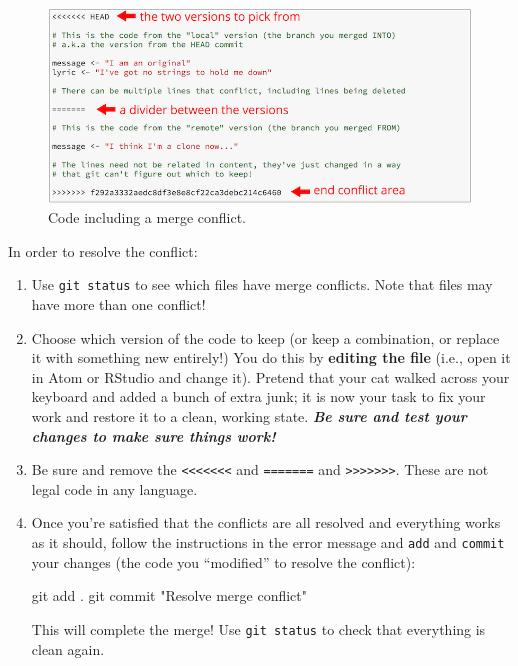 \documentclass[]{book}
\newenvironment{Shaded}{\begin{snugshade}}{\end{snugshade}}
\newcommand{\StringTok}[1]{\textcolor[rgb]{0.31,0.60,0.02}{#1}}
\newcommand{\FunctionTok}[1]{\textcolor[rgb]{0.00,0.00,0.00}{#1}}
\newcommand{\NormalTok}[1]{#1}
\theoremstyle{definition}
\theoremstyle{definition}
\theoremstyle{remark}
\begin{document}
\begin{figure}
\centering
\includegraphics{img/git-branches/merge-conflict.png}
\caption{Code including a merge conflict.}
\end{figure}

In order to resolve the conflict:

\begin{enumerate}
\def\labelenumi{\arabic{enumi}.}
\item
  Use \texttt{git\ status} to see which files have merge conflicts. Note
  that files may have more than one conflict!
\item
  Choose which version of the code to keep (or keep a combination, or
  replace it with something new entirely!) You do this by
  \textbf{editing the file} (i.e., open it in Atom or RStudio and change
  it). Pretend that your cat walked across your keyboard and added a
  bunch of extra junk; it is now your task to fix your work and restore
  it to a clean, working state. \textbf{\emph{Be sure and test your
  changes to make sure things work!}}
\item
  Be sure and remove the
  \texttt{\textless{}\textless{}\textless{}\textless{}\textless{}\textless{}\textless{}}
  and \texttt{=======} and
  \texttt{\textgreater{}\textgreater{}\textgreater{}\textgreater{}\textgreater{}\textgreater{}\textgreater{}}.
  These are not legal code in any language.
\item
  Once you're satisfied that the conflicts are all resolved and
  everything works as it should, follow the instructions in the error
  message and \texttt{add} and \texttt{commit} your changes (the code
  you ``modified'' to resolve the conflict):

\begin{Shaded}
\begin{Highlighting}[]
\FunctionTok{git}\NormalTok{ add .}
\FunctionTok{git}\NormalTok{ commit }\StringTok{"Resolve merge conflict"}
\end{Highlighting}
\end{Shaded}

  This will complete the merge! Use \texttt{git\ status} to check that
  everything is clean again.
\end{enumerate}
\end{document}
